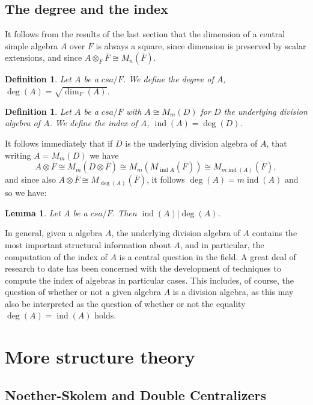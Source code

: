 \documentclass[12pt]{report}
\theoremstyle{plain}
\newtheorem{defn}[thm]{Definition}
\newtheorem{lem}[thm]{Lemma}
\newcommand{\oper}[1]{\operatorname{#1}}
\newcommand{\ov}{\overline}
\newcommand{\ind}{\oper{ind}}
\begin{document}
\subsection{The degree and the index}

It follows from the results of the last section that the dimension of a
central simple algebra $A$ over $F$ is always a square, since dimension is
preserved by scalar extensions, and since $A \otimes_F \ov F \cong M_n(\ov
F)$.

\begin{defn}
Let $A$ be a $csa/F$. We define the degree of $A$, $\deg(A) = \sqrt{\dim_F(A)}$.
\end{defn}

\begin{defn}
Let $A$ be a $csa/F$ with $A \cong M_m(D)$ for $D$ the underlying division
algebra of $A$. We define the index of $A$, $\ind(A) = \deg(D)$.
\end{defn}

It follows immediately that if $D$ is the underlying division algebra of
$A$, that writing $A = M_m(D)$ we have 
\[A \otimes \ov F \cong M_m(D \otimes \ov F) \cong M_m(M_{\ind A}(\ov F))
\cong M_{m \ind(A)}(\ov F), \] 
and since also $A \otimes \ov F \cong M_{\deg(A)}(\ov F)$, it follows
$\deg(A) = m \ind(A)$ and so we have:
\begin{lem}
Let $A$ be a $csa/F$. Then $\ind(A) | \deg(A)$.
\end{lem}

In general, given a algebra $A$, the underlying division algebra of $A$
contains the most important structural information about $A$, and in
particular, the computation of the index of $A$ is a central question in
the field. A great deal of research to date has been concerned with the
development of techniques to compute the index of algebras in particular
cases. This includes, of course, the question of whether or not a given
algebra $A$ is a division algebra, as this may also be interpreted as the
question of whether or not the equality $\deg(A) = \ind(A)$ holds.

\section{More structure theory}

\subsection{Noether-Skolem and Double Centralizers}
\end{document}
